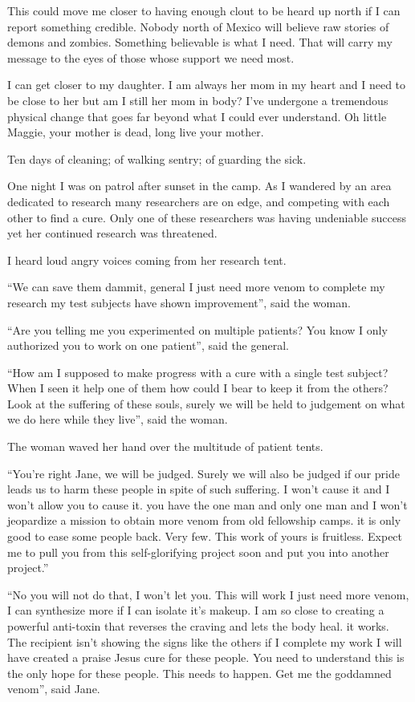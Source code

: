 This could move me closer to having enough clout to be heard up north if I can report something credible. Nobody north of Mexico will believe raw stories of demons and zombies. Something believable is what I need. That will carry my message to the eyes of those whose support we need most.

I can get closer to my daughter. I am always her mom in my heart and I need to be close to her but am I still her mom in body? I've undergone a tremendous physical change that goes far beyond what I could ever understand. Oh little Maggie, your mother is dead, long live your mother.

\parasep

Ten days of cleaning; of walking sentry; of guarding the sick.

One night I was on patrol after sunset in the camp. As I wandered by an area dedicated to research many researchers are on edge, and competing with each other to find a cure. Only one of these researchers was having undeniable success yet her continued research was threatened.

I heard loud angry voices coming from her research tent. 

``We can save them dammit, general I just need more venom to complete my research my test subjects have shown improvement'', said the woman.

``Are you telling me you experimented on multiple patients? You know I only authorized you to work on one patient'', said the general.

``How am I supposed to make progress with a cure with a single test subject? When I seen it help one of them how could I bear to keep it from the others? Look at the suffering of these souls, surely we will be held to judgement on what we do here while they live'', said the woman.

The woman waved her hand over the multitude of patient tents. 

``You're right Jane, we will be judged. Surely we will also be judged if our pride leads us to harm these people in spite of such suffering. I won't cause it and I won't allow you to cause it. you have the one man and only one man and I won't jeopardize a mission to obtain more venom from old fellowship camps. it is only good to ease some people back. Very few. This work of yours is fruitless. Expect me to pull you from this self-glorifying project soon and put you into another project.''

``No you will not do that, I won't let you. This will work I just need more venom, I can synthesize more if I can isolate it's makeup. I am so close to creating a powerful anti-toxin that reverses the craving and lets the body heal. it works. The recipient isn't showing the signs like the others if I complete my work I will have created a praise Jesus cure for these people. You need to understand this is the only hope for these people. This needs to happen. Get me the goddamned venom'', said Jane.

